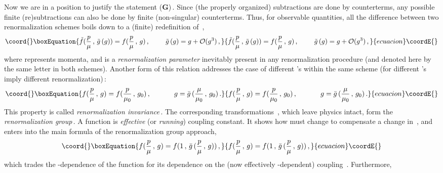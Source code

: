 \documentclass[a4paper,12pt]{article}
\begin{document}
Now we are in a position to justify the statement (\textbf{G})\,. Since (the
properly organized) subtractions are done by counterterms, any possible
finite (re)subtractions can also be done by finite (non-singular)
counterterms. Thus, for observable quantities, all the difference between
two renormalization schemes boils down to a (finite) redefinition of \coordHE{}\,,
\begin{equation}\coord{}\boxEquation{
\label{sch}
\tilde f(\frac{p}{\mu}\,,\,\tilde g\,(g)) = f(\frac{p}{\mu}\,,\,g)\,,
\ \ \ \ \ \ \ \tilde g\,(g) = g + \mathcal{O}(g^3)\,,
}{
\tilde f(\frac{p}{\mu}\,,\,\tilde g\,(g)) = f(\frac{p}{\mu}\,,\,g)\,,
\ \ \ \ \ \ \ \tilde g\,(g) = g + \mathcal{O}(g^3)\,,
}{ecuacion}\coordE{}\end{equation}
where \coordHE{} represents momenta, and \myHighlight{$\mu$}\coordHE{} is a \emph{renormalization parameter}
inevitably present in any renormalization procedure
(and denoted here by the same letter in both schemes). Another
form of this relation addresses the case of different \myHighlight{$\mu$}\coordHE{}'s within the
same scheme (for different \myHighlight{$\mu$}\coordHE{}'s imply different renormalization)\,:
\begin{equation}\coord{}\boxEquation{
\label{reninv}
f(\frac{p}{\mu}\,,\,g) = f(\frac{p}{\mu_0}\,,\,g_0)\,, \ \ \ \ \ \ \ \ \ \
g = \bar{g}\,(\frac{\mu}{\mu_0}\,,\,g_0)\,.
}{
f(\frac{p}{\mu}\,,\,g) = f(\frac{p}{\mu_0}\,,\,g_0)\,, \ \ \ \ \ \ \ \ \ \
g = \bar{g}\,(\frac{\mu}{\mu_0}\,,\,g_0)\,.
}{ecuacion}\coordE{}\end{equation}
This property is called \emph{renormalization invariance}\,. The
corresponding transformations \coordHE{}\,,
which leave physics intact, form the \emph{renormalization group}\,.
A function \myHighlight{$\bar{g}$}\coordHE{} is \emph{effective} (or \emph{running}) coupling
constant. It shows how \myHighlight{$g$}\coordHE{} must change to compensate a change in \myHighlight{$\mu$}\coordHE{}\,,
and enters into the main formula of the renormalization group approach,
\begin{equation}\coord{}\boxEquation{
\label{RG}
f(\frac{p}{\mu}\,,\,g) = f(1\,,\,\bar{g}\,(\frac{p}{\mu}\,,\,g))\,,
}{
f(\frac{p}{\mu}\,,\,g) = f(1\,,\,\bar{g}\,(\frac{p}{\mu}\,,\,g))\,,
}{ecuacion}\coordE{}\end{equation}
which trades the \myHighlight{$p$}\coordHE{}-dependence of the function \coordHE{} for its dependence
on the (now effectively \coordHE{}-dependent) coupling \coordHE{}\,. Furthermore,
\end{document}
